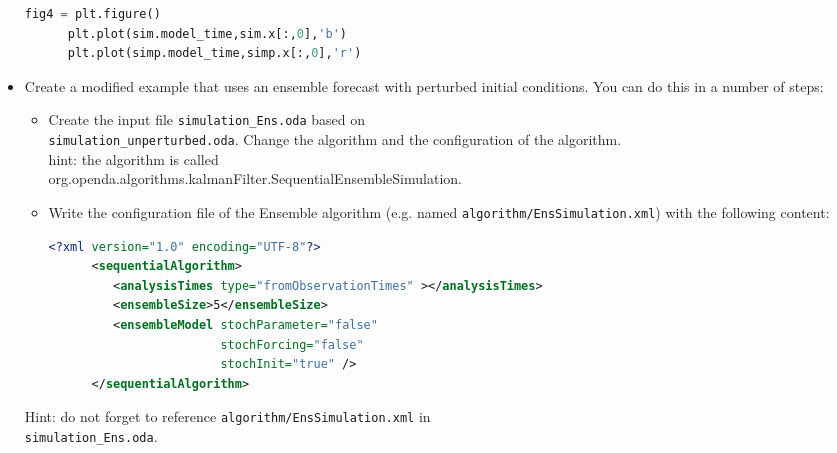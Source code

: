\documentclass[a4paper,10pt]{article}
\begin{document}
\begin{itemize}
\begin{lstlisting}[language=Python,frame=single,caption={Python}]
      fig4 = plt.figure()
      plt.plot(sim.model_time,sim.x[:,0],'b')
      plt.plot(simp.model_time,simp.x[:,0],'r')
      \end{lstlisting}

\item Create a modified example that uses an ensemble forecast with perturbed
      initial conditions. You can do this in a number of steps:
      \begin{itemize}
      \item Create the input file {\tt simulation\_Ens.oda} based on\\
            {\tt simulation\_unperturbed.oda}. Change the algorithm and the
            configuration of the algorithm.\\
            hint: the algorithm is called \\
            org.openda.algorithms.kalmanFilter.SequentialEnsembleSimulation.
      \item Write the configuration file of the Ensemble algorithm (e.g. named
            {\tt algorithm/EnsSimulation.xml}) with the following content:
      \begin{lstlisting}[language=XML,frame=single,caption={XML-input for sequentialAlgorithm}]
      <?xml version="1.0" encoding="UTF-8"?>
      <sequentialAlgorithm>
         <analysisTimes type="fromObservationTimes" ></analysisTimes>
         <ensembleSize>5</ensembleSize>
         <ensembleModel stochParameter="false"
                        stochForcing="false"
                        stochInit="true" />
      </sequentialAlgorithm>
      \end{lstlisting}
      \end{itemize}
      Hint: do not forget to reference {\tt algorithm/EnsSimulation.xml} in \\ {\tt simulation\_Ens.oda}.




\end{itemize}
\end{document}
